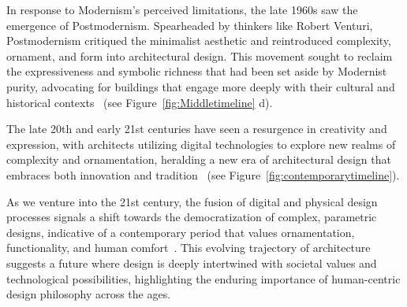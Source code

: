In response to Modernism's perceived limitations, the late 1960s saw the emergence of Postmodernism.
Spearheaded by thinkers like Robert Venturi, Postmodernism critiqued the minimalist aesthetic and reintroduced complexity, ornament, and form into architectural design.
This movement sought to reclaim the expressiveness and symbolic richness that had been set aside by Modernist purity, advocating for buildings that engage more deeply with their cultural and historical contexts~\cite{Venturi1972} (see Figure~\ref{fig:Middletimeline} d).

The late 20th and early 21st centuries have seen a resurgence in creativity and expression, with architects utilizing digital technologies to explore new realms of complexity and ornamentation, heralding a new era of architectural design that embraces both innovation and tradition~\cite{Burlando2019} (see Figure~\ref{fig:contemporarytimeline}).

As we venture into the 21st century, the fusion of digital and physical design processes signals a shift towards the democratization of complex, parametric designs, indicative of a contemporary period that values ornamentation, functionality, and human comfort~\cite{Schwab2016}.
This evolving trajectory of architecture suggests a future where design is deeply intertwined with societal values and technological possibilities, highlighting the enduring importance of human-centric design philosophy across the ages.


